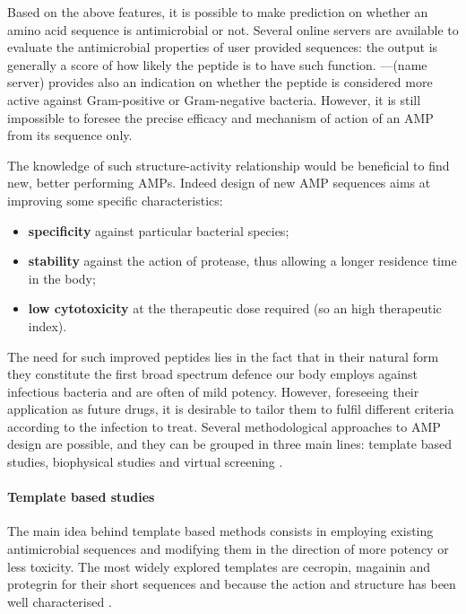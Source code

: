 %
Based on the above features, it is possible to make prediction on whether an amino acid sequence is antimicrobial or not. Several online servers are available to evaluate the antimicrobial properties of user provided sequences: the output is generally a score of how likely the peptide is to have such function. ---(name server) provides also an indication on whether the peptide is considered more active against Gram-positive or Gram-negative bacteria.
%
However, it is still impossible to foresee the precise efficacy and mechanism of action of an AMP from its sequence only.

The knowledge of such structure-activity relationship would be beneficial to find new, better performing AMPs. Indeed design of new AMP sequences aims at improving some specific characteristics:
\begin{itemize}
\item \textbf{specificity} against particular bacterial species;
\item \textbf{stability} against the action of protease, thus allowing a longer residence time in the body;
\item \textbf{low cytotoxicity} at the therapeutic dose required (so an high therapeutic index).
\end{itemize}
The need for such improved peptides lies in the fact that in their natural form they constitute the first broad spectrum defence our body employs against infectious bacteria and are often of mild potency. However, foreseeing their application as future drugs, it is desirable to tailor them to fulfil different criteria according to the infection to treat.
%
Several methodological approaches to AMP design are possible, and they can be grouped in three main lines: template based studies, biophysical studies and virtual screening \cite{Fjell2011}.


\paragraph{Template based studies}
The main idea behind template based methods consists in employing existing antimicrobial sequences and modifying them in the direction of more potency or less toxicity. The most widely explored templates are cecropin, magainin and protegrin for their short sequences and because the action and structure has been well characterised \cite{Wiradharma2011,Huang2010,Pag2008,Wang2015}.

